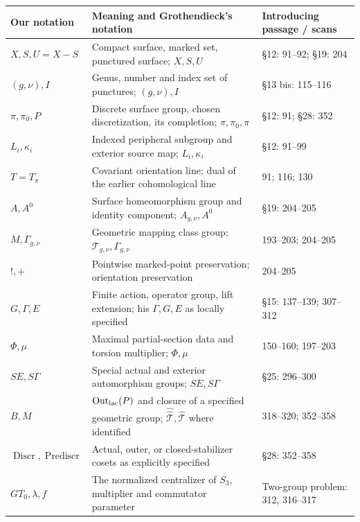 \documentclass[11pt,a4paper]{article}
\begin{document}
{\small\renewcommand{\arraystretch}{1.13}\noindent
\begin{tabular}{@{}p{}p{}p{}@{}}
\toprule
Our notation & Meaning and Grothendieck's notation & Introducing passage / scans\\
\midrule
$X,S,U=X-S$ & Compact surface, marked set, punctured surface; $X,S,U$ & \S12: 91--92; \S19: 204\\
$(g,\nu),I$ & Genus, number and index set of punctures; $(g,\nu),I$ & \S13 bis: 115--116\\
$\pi,\pi_0,P$ & Discrete surface group, chosen discretization, its completion; $\pi,\pi_0,\pi$ & \S12: 91; \S28: 352\\
$L_i,\kappa_i$ & Indexed peripheral subgroup and exterior source map; $L_i,\kappa_i$ & \S12: 91--99\\
$T=T_\pi$ & Covariant orientation line; dual of the earlier cohomological line & 91; 116; 130\\
$A,A^0$ & Surface homeomorphism group and identity component; $A_{g,\nu},A^0$ & \S19: 204--205\\
$M,\Gamma_{g,\nu}$ & Geometric mapping class group; $\mathcal T_{g,\nu},\Gamma_{g,\nu}$ & 193--203; 204--205\\
$!,+$ & Pointwise marked-point preservation; orientation preservation & 204--205\\
$G,\Gamma,E$ & Finite action, operator group, lift extension; his $\Gamma,G,E$ as locally specified & \S15: 137--139; 307--312\\
$\Phi,\mu$ & Maximal partial-section data and torsion multiplier; $\Phi,\mu$ & 150--160; 197--203\\
$SE,S\Gamma$ & Special actual and exterior automorphism groups; $SE,S\Gamma$ & \S25: 296--300\\
$B,\overline M$ & $\operatorname{Out}_{\rm lac}(P)$ and closure of a specified geometric group; $\widehat{\widehat{\mathcal T}},\widehat{\mathcal T}$ where identified & 318--320; 352--358\\
$\operatorname{Discr},\operatorname{Prediscr}$ & Actual, outer, or closed-stabilizer cosets as explicitly specified & \S28: 352--358\\
$GT_0,\lambda,f$ & The normalized centralizer of $S_3$, multiplier and commutator parameter & Two-group problem: 312, 316--317\\
\bottomrule
\end{tabular}}

\clearpage
\end{document}
